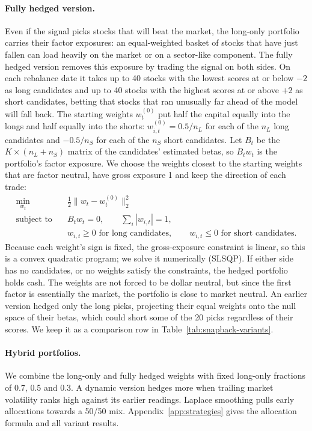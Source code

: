 \documentclass[11pt,letterpaper]{article}
\begin{document}
\paragraph{Fully hedged version.} Even if the signal picks stocks that will beat the market, the long-only portfolio carries their factor exposures: an equal-weighted basket of stocks that have just fallen can load heavily on the market or on a sector-like component. The fully hedged version removes this exposure by trading the signal on both sides. On each rebalance date it takes up to 40 stocks with the lowest scores at or below $-2$ as long candidates and up to 40 stocks with the highest scores at or above $+2$ as short candidates, betting that stocks that ran unusually far ahead of the model will fall back. The starting weights $w^{(0)}_t$ put half the capital equally into the longs and half equally into the shorts: $w^{(0)}_{i,t} = 0.5 / n_L$ for each of the $n_L$ long candidates and $-0.5 / n_S$ for each of the $n_S$ short candidates. Let $B_t$ be the $K \times (n_L + n_S)$ matrix of the candidates' estimated betas, so $B_t w_t$ is the portfolio's factor exposure. We choose the weights closest to the starting weights that are factor neutral, have gross exposure 1 and keep the direction of each trade:
\[
\begin{aligned}
\min_{w_t} \quad & \tfrac{1}{2} \lVert w_t - w^{(0)}_t \rVert_2^2 \\
\text{subject to} \quad & B_t w_t = 0, \qquad \textstyle\sum_i |w_{i,t}| = 1, \\
& w_{i,t} \ge 0 \text{ for long candidates}, \qquad w_{i,t} \le 0 \text{ for short candidates}.
\end{aligned}
\]
Because each weight's sign is fixed, the gross-exposure constraint is linear, so this is a convex quadratic program; we solve it numerically (SLSQP). If either side has no candidates, or no weights satisfy the constraints, the hedged portfolio holds cash. The weights are not forced to be dollar neutral, but since the first factor is essentially the market, the portfolio is close to market neutral. An earlier version hedged only the long picks, projecting their equal weights onto the null space of their betas, which could short some of the 20 picks regardless of their scores. We keep it as a comparison row in Table~\ref{tab:snapback-variants}.

\paragraph{Hybrid portfolios.} We combine the long-only and fully hedged weights with fixed long-only fractions of 0.7, 0.5 and 0.3. A dynamic version hedges more when trailing market volatility ranks high against its earlier readings. Laplace smoothing pulls early allocations towards a 50/50 mix. Appendix~\ref{app:strategies} gives the allocation formula and all variant results.
\end{document}
